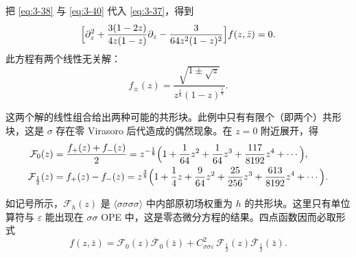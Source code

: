 
把 \eqref{eq:3-38} 与 \eqref{eq:3-40} 代入 \eqref{eq:3-37}，得到
\begin{equation}\label{eq:3-41}
  \Bigl[\partial_z^2+\frac{3(1-2z)}{4z(1-z)}\partial_z
  -\frac{3}{64z^2(1-z)^2}\Bigr]f(z,\bar z)=0 .
\end{equation}
此方程有两个线性无关解：
\begin{equation}\label{eq:3-42}
  f_\pm(z)=\frac{\sqrt{1\pm\sqrt z}}{z^{\frac18}(1-z)^{\frac18}} .
\end{equation}

这两个解的线性组合给出两种可能的共形块。此例中只有有限个（即两个）共形块，这是 $\sigma$ 存在零 Virasoro 后代造成的偶然现象。在 $z=0$ 附近展开，得
\begin{equation}\label{eq:3-43}
  \begin{aligned}
  \mathcal{F}_0(z)&=\frac{f_+(z)+f_-(z)}{2}
  =z^{-\frac18}\Bigl(1+\frac{1}{64}z^2+\frac{1}{64}z^3+\frac{117}{8192}z^4+\cdots\Bigr),\\
  \mathcal{F}_{\frac12}(z)&=f_+(z)-f_-(z)
  =z^{\frac38}\Bigl(1+\frac14z+\frac{9}{64}z^2+\frac{25}{256}z^3+\frac{613}{8192}z^4+\cdots\Bigr).
  \end{aligned}
\end{equation}


如记号所示，$\mathcal{F}_h(z)$ 是 $\langle\sigma\sigma\sigma\sigma\rangle$ 中内部原初场权重为 $h$ 的共形块。这里只有单位算符与 $\varepsilon$ 能出现在 $\sigma\sigma$ OPE 中，这是零态微分方程的结果。四点函数因而必取形式
\begin{equation}\label{eq:3-44}
  f(z,\bar z)=\mathcal{F}_0(z)\overline{\mathcal{F}}_0(\bar z)
  +C_{\sigma\sigma\varepsilon}^2\,\mathcal{F}_{\frac12}(z)
  \overline{\mathcal{F}}_{\frac12}(\bar z).
\end{equation}

